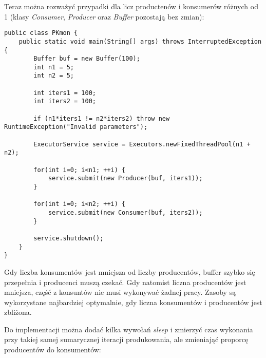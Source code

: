 \documentclass{article}
\begin{document}
Teraz można rozważyć przypadki dla licz productenów i konsumerów różnych od 1 (klasy 
\textit{Consumer}, \textit{Producer} oraz \textit{Buffer} pozostają bez zmian):

\begin{verbatim}
public class PKmon {    
    public static void main(String[] args) throws InterruptedException {
        Buffer buf = new Buffer(100);
        int n1 = 5;
        int n2 = 5;

        int iters1 = 100;
        int iters2 = 100;

        if (n1*iters1 != n2*iters2) throw new RuntimeException("Invalid parameters");

        ExecutorService service = Executors.newFixedThreadPool(n1 + n2);

        for(int i=0; i<n1; ++i) {
            service.submit(new Producer(buf, iters1));
        }

        for(int i=0; i<n2; ++i) {
            service.submit(new Consumer(buf, iters2));
        }

        service.shutdown();
    }
}
\end{verbatim}

Gdy liczba konsumentów jest mniejsza od liczby producentów, buffer szybko się przepełnia i 
producenci muszą czekać. Gdy natomist liczna producentów jest mniejsza, część z konsuntów nie
musi wykonywać żadnej pracy. Zasoby są wykorzystane najbardziej optymalnie, gdy liczna konsumentów
i producentów jest zbliżona.

Do implementacji można dodać kilka wywołań \textit{sleep} i zmierzyć czas wykonania przy takiej samej sumarycznej
iteracji produkowania, ale zmieniająć proporcę producentów do konsumentów:
\end{document}
